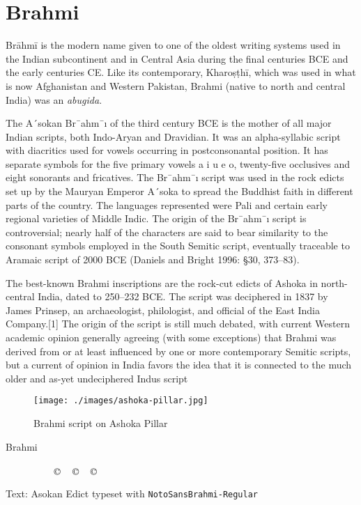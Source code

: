 \section{Brahmi}
\label{s:brahmi}
Brāhmī is the modern name given to one of the oldest writing systems used in the Indian subcontinent and in Central Asia during the final centuries BCE and the early centuries CE. Like its contemporary, Kharoṣṭhī, which was used in what is now Afghanistan and Western Pakistan, Brahmi (native to north and central India) was an \emph{abugida}.

The A´sokan Br¯ahm¯ı of the third century BCE is the mother of all major Indian scripts,
both Indo-Aryan and Dravidian. It was an alpha-syllabic script with diacritics used for
vowels occurring in postconsonantal position. It has separate symbols for the five primary
vowels a i u e o, twenty-five occlusives and eight sonorants and fricatives. The Br¯ahm¯ı
script was used in the rock edicts set up by the Mauryan Emperor A´soka to spread the
Buddhist faith in different parts of the country. The languages represented were Pali
and certain early regional varieties of Middle Indic. The origin of the Br¯ahm¯ı script is
controversial; nearly half of the characters are said to bear similarity to the consonant
symbols employed in the South Semitic script, eventually traceable to Aramaic script of
2000 BCE (Daniels and Bright 1996: §30, 373–83).

The best-known Brahmi inscriptions are the rock-cut edicts of Ashoka in north-central India, dated to 250–232 BCE. The script was deciphered in 1837 by James Prinsep, an archaeologist, philologist, and official of the East India Company.[1] The origin of the script is still much debated, with current Western academic opinion generally agreeing (with some exceptions) that Brahmi was derived from or at least influenced by one or more contemporary Semitic scripts, but a current of opinion in India favors the idea that it is connected to the much older and as-yet undeciphered Indus script

\begin{figure}[htb]
\centering
\texttt{[image: ./images/ashoka-pillar.jpg]}
\caption{Brahmi script on Ashoka Pillar}
\end{figure}



\begin{scriptexample}[]{Brahmi}
\bgroup
\raggedleft
\brahmi

         
   

\arial
\hfill Text: Asokan Edict typeset with \texttt{NotoSansBrahmi-Regular} 
\egroup
\end{scriptexample}

